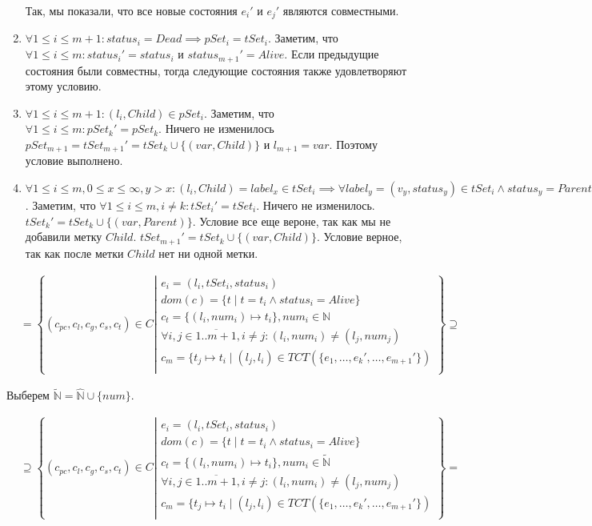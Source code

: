 \begin{enumerate}
Так, мы показали, что все новые состояния $e_i'$ и $e_j'$ являются совместными.
\item $\forall 1 \le i \le m+1: status_i = Dead \implies pSet_i = tSet_i$.
Заметим, что $\forall 1 \le i \le m: status_i' = status_i$ и $status_{m+1}' = Alive$.
Если предыдущие состояния были совместны, тогда следующие состояния также удовлетворяют этому условию.
\item $\forall 1 \le i \le m+1: (l_i, Child) \in pSet_i$.
Заметим, что $\forall 1 \le i \le m: pSet_k' = pSet_k$. Ничего не изменилось
$pSet_{m+1} = tSet_{m+1}' = tSet_k \cup \{(var, Child)\}$ и $l_{m+1} = var$. Поэтому условие выполнено.
\item $\forall 1 \le i \le m, 0 \le x \le \infty, y > x: (l_i, Child) = label_x \in tSet_i \implies \forall label_y = (v_y, status_y) \in tSet_i \land status_y = Parent$.
Заметим, что $\forall 1 \le i \le m, i \neq k: tSet_i' = tSet_i$. Ничего не изменилось.
$tSet_k' = tSet_k \cup \{(var, Parent)\}$. Условие все еще вероне, так как мы не добавили метку $Child$.
$tSet_{m+1}' = tSet_k \cup \{(var, Child)\}$. Условие верное, так как после метки $Child$ нет ни одной метки.
\end{enumerate}

\begin{align}
& = \left\lbrace (c_{pc},c_l,c_g,c_s, c_t) \in C 
\left| 
\begin{array}{c}
e_i = (l_i, tSet_i, status_i) \\
dom(c) = \{t \mid t = t_i \land status_i = Alive\}\\
c_t = \{(l_i, num_i) \mapsto t_i\}, num_i \in \mathbb{N} \\
\forall i, j \in \overline{1..m+1}, i \neq j: (l_i, num_i) \neq (l_j, num_j)\\
c_m = \{ t_j \mapsto t_i \mid (l_j, l_i) \in TCT(\{e_1, \dots, e_k', \dots, e_{m+1}'\}) \\
\end{array}
\right.
\right\rbrace \supseteq \nonumber
\end{align}

Выберем $\tilde{\mathbb{N}} = \widehat{\mathbb{N}} \cup \{num\}$.

\begin{align}
& \supseteq \left\lbrace (c_{pc},c_l,c_g,c_s, c_t) \in C 
\left| 
\begin{array}{c}
e_i = (l_i, tSet_i, status_i) \\
dom(c) = \{t \mid t = t_i \land status_i = Alive\}\\
c_t = \{(l_i, num_i) \mapsto t_i\}, num_i \in \tilde{\mathbb{N}} \\
\forall i, j \in \overline{1..m+1}, i \neq j: (l_i, num_i) \neq (l_j, num_j)\\
c_m = \{ t_j \mapsto t_i \mid (l_j, l_i) \in TCT(\{e_1, \dots, e_k', \dots, e_{m+1}'\}) \\
\end{array}
\right.
\right\rbrace = \nonumber
\end{align}

